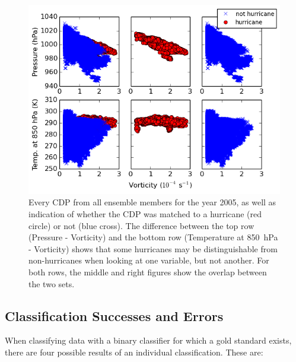 \documentclass[pdftex,12pt,a4paper]{report}
\begin{document}
\begin{figure}[hb!]
    \centering
    \includegraphics[width=\textwidth]{figures/cdp_2005_with_hurrs}
    \vspace{-10pt}
    \caption{Every CDP from all ensemble members for the year 2005, as well as indication of whether
        the CDP was matched to a hurricane (red circle) or not (blue cross). The difference between
        the top row (Pressure - Vorticity) and the bottom row (Temperature at \SI{850}{hPa} -
        Vorticity) shows that some hurricanes may be distinguishable from non-hurricanes when
        looking at one variable, but not another. For both rows, the middle and right figures show the
        overlap between the two sets.}
    \label{fig:cdp_2005_with_hurrs}
\end{figure}

\subsection{Classification Successes and Errors}
\label{sec:cla_successes_and_errors}

When classifying data with a binary classifier for which a gold standard exists, there are four
possible results of an individual classification. These are:
\end{document}
